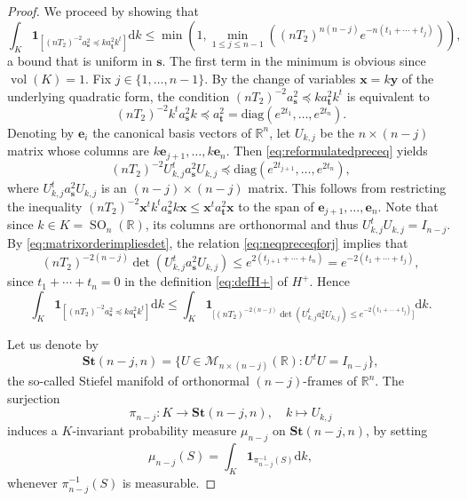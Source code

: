 \documentclass[11pt,reqno]{amsart}
\theoremstyle{definition}
\theoremstyle{remark}
\newcommand{\vol}{\operatorname{vol}}
\newcommand{\SO}{\operatorname{SO}}
\numberwithin{equation}{section}
\numberwithin{thm}{section}
\numberwithin{table}{section}
\def \R {{\mathbb R}}
\newcommand{\y}{\mathbf{y}}
\newcommand{\x}{\mathbf{x}}
\begin{document}
\begin{proof}
We proceed by  showing that 
\begin{equation}\label{eq:Kintegraljbound}
        \int_K  \mathbf{1}_{[ (nT_2)^{-2} a_{\mathbf{s}}^2 \preceq  k a_{\mathbf{t}}^2 k^t ]} \mathrm{d}k  \le \min \left(1, \min_{1\le j \le n-1} ((nT_2)^{n(n-j)} e^{-n(t_1 + \cdots + t_j)}) \right),
\end{equation}
a bound that is  uniform in $\mathbf{s}$. The first term in the minimum is obvious since $\vol (K)=1$. Fix $j \in \{1, \ldots, n-1\}$. By the change of variables $\x = k \y$ of the underlying quadratic form, the condition $ (nT_2)^{-2} a_{\mathbf{s}}^2 \preceq  k a_{\mathbf{t}}^2 k^t $ is equivalent to 
\begin{equation}\label{eq:reformulatedpreceq}
       (nT_2)^{-2} k^t a_{\mathbf{s}}^2 k \preceq  a_{\mathbf{t}}^2 = \mathrm{diag}(e^{2t_1}, \ldots, e^{2t_n}).
\end{equation}
 Denoting by $\mathbf{e}_i$ the canonical basis vectors of $\R^n$, let $U_{k,j}$ be the $n \times (n-j)$ matrix whose columns are $k\mathbf{e}_{j+1}, \ldots, k\mathbf{e}_{n}$. Then \eqref{eq:reformulatedpreceq} yields 
\begin{equation}\label{eq:neqpreceqforj}
          (nT_2)^{-2} U_{k,j}^t a_{\mathbf{s}}^2 U_{k,j} \preceq   \mathrm{diag}(e^{2t_{j+1}}, \ldots, e^{2t_n}),
\end{equation}
where $U_{k,j}^t a_{\mathbf{s}}^2 U_{k,j} $ is an $(n-j)\times (n-j)$ matrix. 
This follows from restricting the inequality $ (nT_2)^{-2} \x^t k^t a_{\mathbf{s}}^2 k \x \le \x^t a_{\mathbf{t}}^2 \x $ to the span of
$\mathbf{e}_{j+1}, \ldots, \mathbf{e}_{n}$. 
Note that since $k \in K = \SO_n(\R)$, its columns are orthonormal and thus $U_{k,j}^t U_{k,j} = I_{n-j}$.
By \eqref{eq:matrixorderimpliesdet}, the relation
\eqref{eq:neqpreceqforj} implies that
\[
    (nT_2)^{-2(n-j)} \det(U_{k,j}^ta_{\mathbf{s}}^2 U_{k,j}) \le e^{2 (t_{j+1}+\cdots+t_n) } = e^{-2(t_1 + \cdots + t_j)},
\]
since $t_1 + \cdots + t_n = 0$ in the  definition  \eqref{eq:defH+}
of $H^+$. 
Hence
\[
\int_K  \mathbf{1}_{[ (nT_2)^{-2} a_{\mathbf{s}}^2 \preceq  k a_{\mathbf{t}}^2 k^t ]} \mathrm{d}k  \le 
\int_K  \mathbf{1}_{\big[ (nT_2)^{-2(n-j)} \det(U_{k,j}^ta_{\mathbf{s}}^2 U_{k,j}) \le e^{-2(t_1 + \cdots + t_j)}\big]} \mathrm{d}k.
\]

Let us denote by
\[
    \mathbf{St}(n-j,n) = 
    \{ U \in \mathcal{M}_{n \times (n-j)}(\R): U^t U = I_{n-j}
    \},
\]
the so-called Stiefel manifold of orthonormal $(n-j)$-frames of $\R^n$.
The surjection
\[
    \pi_{n-j}: K \to \mathbf{St}(n-j,n), \quad k \mapsto U_{k,j}
\]
induces a $K$-invariant probability measure $\mu_{n-j}$ on $\mathbf{St}(n-j,n)$, by setting 
\[
    \mu_{n-j} (S) = \int_{K} \mathbf{1}_{\pi_{n-j}^{-1}(S)} \mathrm{d}k,
\]
whenever $\pi_{n-j}^{-1}(S)$ is measurable. 


\end{proof}
\end{document}
